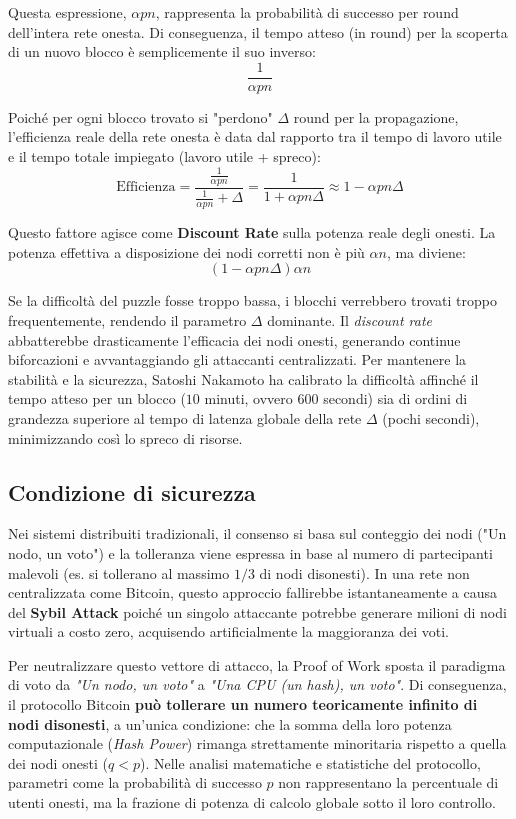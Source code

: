 Questa espressione, $\alpha p n$, rappresenta la probabilità di successo per round dell'intera rete onesta. Di conseguenza, il tempo atteso (in round) per la scoperta di un nuovo blocco è semplicemente il suo inverso:
$$ \frac{1}{\alpha p n} $$

Poiché per ogni blocco trovato si "perdono" $\Delta$ round per la propagazione, l'efficienza reale della rete onesta è data dal rapporto tra il tempo di lavoro utile e il tempo totale impiegato (lavoro utile + spreco):
$$ \text{Efficienza} = \frac{\frac{1}{\alpha p n}}{\frac{1}{\alpha p n} + \Delta} = \frac{1}{1 + \alpha p n \Delta} \approx 1 - \alpha p n \Delta $$

Questo fattore agisce come \textbf{Discount Rate} sulla potenza reale degli onesti. La potenza effettiva a disposizione dei nodi corretti non è più $\alpha n$, ma diviene:
$$ (1 - \alpha p n \Delta) \alpha n $$

Se la difficoltà del puzzle fosse troppo bassa, i blocchi verrebbero trovati troppo frequentemente, rendendo il parametro $\Delta$ dominante. Il \textit{discount rate} abbatterebbe drasticamente l'efficacia dei nodi onesti, generando continue biforcazioni e avvantaggiando gli attaccanti centralizzati. Per mantenere la stabilità e la sicurezza, Satoshi Nakamoto ha calibrato la difficoltà affinché il tempo atteso per un blocco ($10$ minuti, ovvero $600$ secondi) sia di ordini di grandezza superiore al tempo di latenza globale della rete $\Delta$ (pochi secondi), minimizzando così lo spreco di risorse.

\subsection*{Condizione di sicurezza}
Nei sistemi distribuiti tradizionali, il consenso si basa sul conteggio dei nodi ("Un nodo, un voto") e la tolleranza viene espressa in base al numero di partecipanti malevoli (es. si tollerano al massimo $1/3$ di nodi disonesti). 
In una rete non centralizzata come Bitcoin, questo approccio fallirebbe istantaneamente a causa del \textbf{Sybil Attack} poiché un singolo attaccante potrebbe generare milioni di nodi virtuali a costo zero, acquisendo artificialmente la maggioranza dei voti.

Per neutralizzare questo vettore di attacco, la Proof of Work sposta il paradigma di voto da \textit{"Un nodo, un voto"} a \textit{"Una CPU (un hash), un voto"}.
Di conseguenza, il protocollo Bitcoin \textbf{può tollerare un numero teoricamente infinito di nodi disonesti}, a un'unica condizione: che la somma della loro potenza computazionale (\textit{Hash Power}) rimanga strettamente minoritaria rispetto a quella dei nodi onesti ($q < p$). Nelle analisi matematiche e statistiche del protocollo, parametri come la probabilità di successo $p$ non rappresentano la percentuale di utenti onesti, ma la frazione di potenza di calcolo globale sotto il loro controllo.

